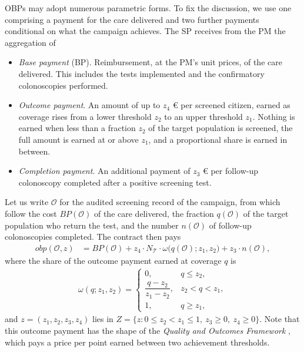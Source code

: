 \documentclass[12pt]{article}
\begin{document}
OBPs may adopt numerous parametric forms. To fix the discussion, we use one comprising a payment for the care delivered and two further payments conditional on what the campaign achieves. The SP receives from the PM the aggregation of
\begin{itemize}
    \item {\em Base payment} (BP). Reimbursement, at the PM's unit prices, of the care delivered. This includes the tests implemented and the confirmatory colonoscopies performed.
    \item {\em Outcome payment}. An amount of up to $z_4$ € per screened citizen, earned as coverage rises from a lower threshold $z_2$ to an upper threshold $z_1$. Nothing is earned when less than a fraction $z_2$ of the target population is screened, the full amount is earned at or above $z_1$, and a proportional share is earned in between.
    \item {\em Completion payment}. An additional payment of $z_3$ € per follow-up colonoscopy completed after a positive screening test.
\end{itemize}
Let us write $\mathcal{O}$ for the audited screening record of the campaign, from which follow the cost $BP(\mathcal{O})$ of the care delivered, the fraction $q(\mathcal{O})$ of the target population who return the test, and the number $n(\mathcal{O})$ of follow-up colonoscopies completed. The contract then pays
\begin{align}\label{eq:obp}
  obp(\mathcal{O}, z) &= BP(\mathcal{O}) + z_4 \cdot N_{\mathcal{T}} \cdot \omega\big(q(\mathcal{O}); z_1, z_2\big) + z_3 \cdot n(\mathcal{O}),
\end{align}
where the share of the outcome payment earned at coverage $q$ is
\begin{align}\label{eq:omega}
  \omega(q; z_1, z_2) =
  \begin{cases}
    0, & q \leq z_2, \\[2pt]
    \dfrac{q - z_2}{z_1 - z_2}, & z_2 < q < z_1, \\[8pt]
    1, & q \geq z_1,
  \end{cases}
\end{align}
and $z = (z_1, z_2, z_3, z_4)$ lies in $Z = \{ z : 0 \leq z_2 < z_1 \leq 1,\ z_3 \geq 0,\ z_4 \geq 0 \}$. Note that this outcome payment has the shape of the \emph{Quality and Outcomes Framework} \citep{campbell2009effects}, which pays a price per point earned between two achievement thresholds.
\end{document}
